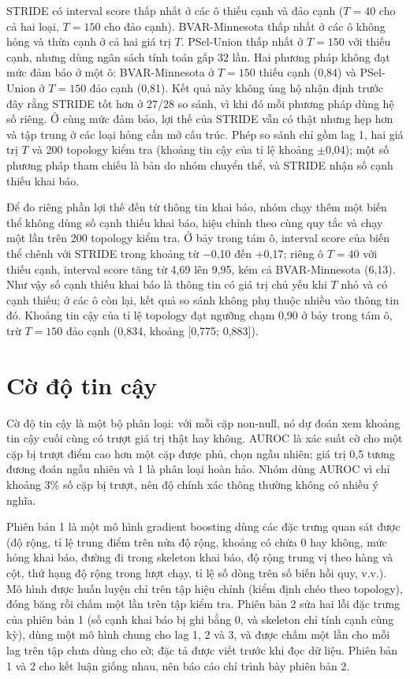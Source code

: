 \documentclass[11pt,a4paper]{article}
\begin{document}
STRIDE có interval score thấp nhất ở các ô thiếu cạnh và đảo cạnh ($T=40$ cho cả hai loại, $T=150$ cho đảo cạnh). BVAR-Minnesota thấp nhất ở các ô không hỏng và thừa cạnh ở cả hai giá trị $T$. PSel-Union thấp nhất ở $T=150$ với thiếu cạnh, nhưng dùng ngân sách tính toán gấp 32 lần. Hai phương pháp không đạt mức đảm bảo ở một ô: BVAR-Minnesota ở $T=150$ thiếu cạnh (0,84) và PSel-Union ở $T=150$ đảo cạnh (0,81). Kết quả này không ủng hộ nhận định trước đây rằng STRIDE tốt hơn ở 27/28 so sánh, vì khi đó mỗi phương pháp dùng hệ số riêng. Ở cùng mức đảm bảo, lợi thế của STRIDE vẫn có thật nhưng hẹp hơn và tập trung ở các loại hỏng cần mở cấu trúc. Phép so sánh chỉ gồm lag 1, hai giá trị $T$ và 200 topology kiểm tra (khoảng tin cậy của tỉ lệ khoảng $\pm$0,04); một số phương pháp tham chiếu là bản do nhóm chuyển thể, và STRIDE nhận số cạnh thiếu khai báo.

Để đo riêng phần lợi thế đến từ thông tin khai báo, nhóm chạy thêm một biến thể không dùng số cạnh thiếu khai báo, hiệu chỉnh theo cùng quy tắc và chạy một lần trên 200 topology kiểm tra. Ở bảy trong tám ô, interval score của biến thể chênh với STRIDE trong khoảng từ $-$0,10 đến +0,17; riêng ô $T=40$ với thiếu cạnh, interval score tăng từ 4,69 lên 9,95, kém cả BVAR-Minnesota (6,13). Như vậy số cạnh thiếu khai báo là thông tin có giá trị chủ yếu khi $T$ nhỏ và có cạnh thiếu; ở các ô còn lại, kết quả so sánh không phụ thuộc nhiều vào thông tin đó. Khoảng tin cậy của tỉ lệ topology đạt ngưỡng chạm 0,90 ở bảy trong tám ô, trừ $T=150$ đảo cạnh (0,834, khoảng {[}0,775; 0,883{]}).

\section{Cờ độ tin cậy}

Cờ độ tin cậy là một bộ phân loại: với mỗi cặp non-null, nó dự đoán xem khoảng tin cậy cuối cùng có trượt giá trị thật hay không. AUROC là xác suất cờ cho một cặp bị trượt điểm cao hơn một cặp được phủ, chọn ngẫu nhiên; giá trị 0,5 tương đương đoán ngẫu nhiên và 1 là phân loại hoàn hảo. Nhóm dùng AUROC vì chỉ khoảng 3\% số cặp bị trượt, nên độ chính xác thông thường không có nhiều ý nghĩa.

Phiên bản 1 là một mô hình gradient boosting dùng các đặc trưng quan sát được (độ rộng, tỉ lệ \textbar trung điểm\textbar{} trên nửa độ rộng, khoảng có chứa 0 hay không, mức hỏng khai báo, đường đi trong skeleton khai báo, độ rộng trung vị theo hàng và cột, thứ hạng độ rộng trong lượt chạy, tỉ lệ số dòng trên số biến hồi quy, v.v.). Mô hình được huấn luyện chỉ trên tập hiệu chỉnh (kiểm định chéo theo topology), đóng băng rồi chấm một lần trên tập kiểm tra. Phiên bản 2 sửa hai lỗi đặc trưng của phiên bản 1 (số cạnh khai báo bị ghi bằng 0, và skeleton chỉ tính cạnh cùng kỳ), dùng một mô hình chung cho lag 1, 2 và 3, và được chấm một lần cho mỗi lag trên tập chưa dùng cho cờ; đặc tả được viết trước khi đọc dữ liệu. Phiên bản 1 và 2 cho kết luận giống nhau, nên báo cáo chỉ trình bày phiên bản 2.
\end{document}
